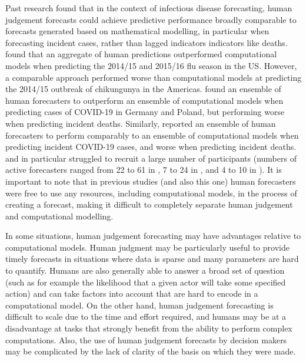 \documentclass[10pt,a4paper,twocolumn]{article}
\begin{document}
Past research found that in the context of infectious disease forecasting, human judgement forecasts could achieve predictive performance broadly comparable to forecasts generated based on mathematical modelling, in particular when forecasting incident cases, rather than lagged indicators indicators like deaths. \citet{farrowHumanJudgmentApproach2017} found that an aggregate of human predictions outperformed computational models when predicting the 2014/15 and 2015/16 flu season in the US. However, a comparable approach performed worse than computational models at predicting the 2014/15 outbreak of chikungunya in the Americas. 
\citet{bosseComparingHumanModelbased2022} found an ensemble of human forecasters to outperform an ensemble of computational models when predicting cases of COVID-19 in Germany and Poland, but performing worse when predicting incident deaths. Similarly, \citet{mcandrewChimericForecastingCombining2022} reported an ensemble of human forecasters to perform comparably to an ensemble of computational models when predicting incident COVID-19 cases, and worse when predicting incident deaths. \citet{farrowHumanJudgmentApproach2017} and in particular \citet{bosseComparingHumanModelbased2022} struggled to recruit a large number of participants (numbers of active forecasters ranged from 22 to 61 in \citet{mcandrewChimericForecastingCombining2022}, 7 to 24 in \citet{farrowHumanJudgmentApproach2017}, and 4 to 10 in \citet{bosseComparingHumanModelbased2022}). 
It is important to note that in previous studies (and also this one) human forecasters were free to use any resources, including computational models, in the process of creating a forecast, making it difficult to completely separate human judgement and computational modelling. 

In some situations, human judgement forecasting may have advantages relative to computational models. Human judgment may be particularly useful to provide timely forecasts in situations where data is sparse and many parameters are hard to quantify. Humans are also generally able to answer a broad set of question (such as for example the likelihood that a given actor will take some specified action) and can take factors into account that are hard to encode in a computational model. On the other hand, human judgement forecasting is difficult to scale due to the time and effort required, and humans may be at a disadvantage at tasks that strongly benefit from the ability to perform complex computations. Also, the use of human judgement forecasts by decision makers may be complicated by the lack of clarity of the basis on which they were made.
\end{document}

